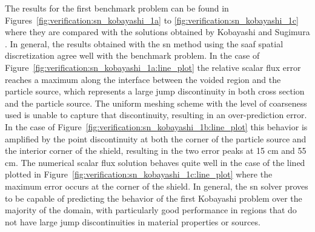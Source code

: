 The results for the first benchmark problem can be found in Figures~\ref{fig:verification:sn_kobayashi_1a} to \ref{fig:verification:sn_kobayashi_1c} where they are compared with the solutions obtained by Kobayashi and Sugimura \cite{kobayashi_benchmarks}. In general, the results obtained with the \acrshort{sn} method using the \acrshort{saaf} spatial discretization agree well with the benchmark problem. In the case of Figure~\ref{fig:verification:sn_kobayashi_1a:line_plot} the relative scalar flux error reaches a maximum along the interface between the voided region and the particle source, which represents a large jump discontinuity in both cross section and the particle source. The uniform meshing scheme with the level of coarseness used is unable to capture that discontinuity, resulting in an over-prediction error. In the case of Figure~\ref{fig:verification:sn_kobayashi_1b:line_plot} this behavior is amplified by the point discontinuity at both the corner of the particle source and the interior corner of the shield, resulting in the two error peaks at 15 cm and 55 cm. The numerical scalar flux solution behaves quite well in the case of the lined plotted in Figure~\ref{fig:verification:sn_kobayashi_1c:line_plot} where the maximum error occurs at the corner of the shield. In general, the \acrshort{sn} solver proves to be capable of predicting the behavior of the first Kobayashi problem over the majority of the domain, with particularly good performance in regions that do not have large jump discontinuities in material properties or sources. 

